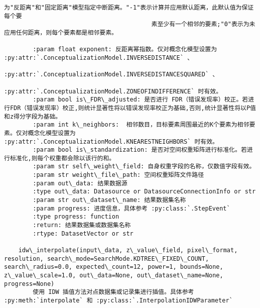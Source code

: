 \documentclass[11pt]{article}
\begin{document}
\begin{Verbatim}[commandchars=\\\{\}]
                                         为"反距离"和"固定距离"模型指定中断距离。"-1"表示计算并应用默认距离，此默认值为保证每个要
                                         素至少有一个相邻的要素;"0"表示为未应用任何距离，则每个要素都是相邻要素。
        
        :param float exponent: 反距离幂指数。仅对概念化模型设置为 :py:attr:`.ConceptualizationModel.INVERSEDISTANCE` 、
                               :py:attr:`.ConceptualizationModel.INVERSEDISTANCESQUARED` 、
                               :py:attr:`.ConceptualizationModel.ZONEOFINDIFFERENCE` 时有效。
        :param bool is\_FDR\_adjusted: 是否进行 FDR（错误发现率）校正。若进行FDR（错误发现率）校正,则统计显著性将以错误发现率校正为基础,否则,统计显著性将以P值和z得分字段为基础。
        :param int k\_neighbors:  相邻数目，目标要素周围最近的K个要素为相邻要素。仅对概念化模型设置为 :py:attr:`.ConceptualizationModel.KNEARESTNEIGHBORS` 时有效。
        :param bool is\_standardization: 是否对空间权重矩阵进行标准化。若进行标准化,则每个权重都会除以该行的和。
        :param str self\_weight\_field: 自身权重字段的名称，仅数值字段有效。
        :param str weight\_file\_path: 空间权重矩阵文件路径
        :param out\_data: 结果数据源
        :type out\_data: Datasource or DatasourceConnectionInfo or str
        :param str out\_dataset\_name: 结果数据集名称
        :param progress: 进度信息，具体参考 :py:class:`.StepEvent`
        :type progress: function
        :return: 结果数据集或数据集名称
        :rtype: DatasetVector or str
    
    idw\_interpolate(input\_data, z\_value\_field, pixel\_format, resolution, search\_mode=SearchMode.KDTREE\_FIXED\_COUNT, search\_radius=0.0, expected\_count=12, power=1, bounds=None, z\_value\_scale=1.0, out\_data=None, out\_dataset\_name=None, progress=None)
        使用 IDW 插值方法对点数据集或记录集进行插值。具体参考 :py:meth:`interpolate` 和 :py:class:`.InterpolationIDWParameter`
        

\end{Verbatim}
\end{document}
